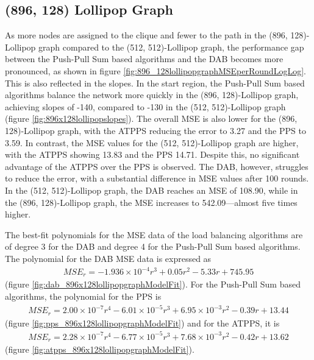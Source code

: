 \subsection{(896, 128) Lollipop Graph}\label{subsec:896_128lollipop}
As more nodes are assigned to the clique and fewer to the path in the (896, 128)-Lollipop graph compared to the (512, 512)-Lollipop graph, the performance gap between the Push-Pull Sum based algorithms and the DAB becomes more pronounced, as shown in figure \ref{fig:896_128lollipopgraphMSEperRoundLogLog}. This is also reflected in the slopes. In the start region, the Push-Pull Sum based algorithms balance the network more quickly in the (896, 128)-Lollipop graph, achieving slopes of -140, compared to -130 in the (512, 512)-Lollipop graph (figure \ref{fig:896x128lollipopslopes}). The overall MSE is also lower for the (896, 128)-Lollipop graph, with the ATPPS reducing the error to 3.27 and the PPS to 3.59. In contrast, the MSE values for the (512, 512)-Lollipop graph are higher, with the ATPPS showing 13.83 and the PPS 14.71. Despite this, no significant advantage of the ATPPS over the PPS is observed. The DAB, however, struggles to reduce the error, with a substantial difference in MSE values after 100 rounds. In the (512, 512)-Lollipop graph, the DAB reaches an MSE of 108.90, while in the (896, 128)-Lollipop graph, the MSE increases to 542.09—almost five times higher.

The best-fit polynomials for the MSE data of the load balancing algorithms are of degree 3 for the DAB and degree 4 for the Push-Pull Sum based algorithms. The polynomial for the DAB MSE data is expressed as 
\begin{align}
    MSE_r=-1.936\times 10^{-4}r^{3}+0.05r^{2}-5.33r+745.95    
\end{align}
(figure \ref{fig:dab_896x128lollipopgraphModelFit}). For the Push-Pull Sum based algorithms, the polynomial for the PPS is 
\begin{align}
    MSE_r=2.00\times 10^{-7}r^{4}-6.01\times 10^{-5}r^{3}+6.95\times 10^{-3}r^{2}-0.39r+13.44
\end{align}
(figure \ref{fig:pps_896x128lollipopgraphModelFit}) and for the ATPPS, it is
\begin{align}
    MSE_r=2.28\times 10^{-7}r^{4}-6.77\times 10^{-5}r^{3}+7.68\times 10^{-3}r^{2}-0.42r+13.62    
\end{align}
(figure \ref{fig:atpps_896x128lollipopgraphModelFit}).

